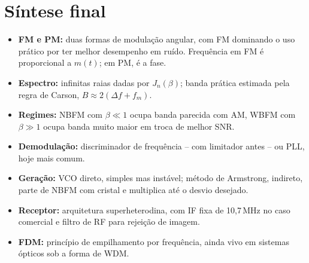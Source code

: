 \documentclass[11pt,a4paper]{article}
\begin{document}
\section{Síntese final}

\begin{itemize}
  \item \textbf{FM e PM:} duas formas de modulação angular, com FM dominando o uso prático por ter melhor desempenho em ruído. Frequência em FM é proporcional a $m(t)$; em PM, é a fase.
  \item \textbf{Espectro:} infinitas raias dadas por $J_n(\beta)$; banda prática estimada pela regra de Carson, $B\approx 2(\Delta f + f_m)$.
  \item \textbf{Regimes:} NBFM com $\beta\ll 1$ ocupa banda parecida com AM, WBFM com $\beta\gg 1$ ocupa banda muito maior em troca de melhor SNR.
  \item \textbf{Demodulação:} discriminador de frequência -- com limitador antes -- ou PLL, hoje mais comum.
  \item \textbf{Geração:} VCO direto, simples mas instável; método de Armstrong, indireto, parte de NBFM com cristal e multiplica até o desvio desejado.
  \item \textbf{Receptor:} arquitetura superheterodina, com IF fixa de 10,7\,MHz no caso comercial e filtro de RF para rejeição de imagem.
  \item \textbf{FDM:} princípio de empilhamento por frequência, ainda vivo em sistemas ópticos sob a forma de WDM.
\end{itemize}
\end{document}
